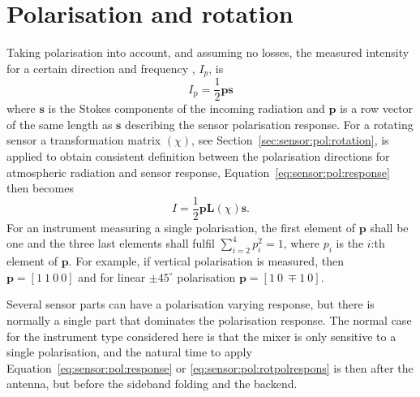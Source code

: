 \section{Polarisation and rotation}
\label{sec:sensor:pol}
Taking polarisation into account, and assuming no losses, the measured intensity for a certain direction and frequency , $I_p$, is
\begin{equation}
\label{eq:sensor:pol:response}
  I_\mathrm{p} = \frac{1}{2} \mathbf{p} \mathbf{s}
\end{equation}
where $\mathbf{s}$ is the Stokes components of the incoming radiation and $\mathbf{p}$ is a row vector of the same length as $\mathbf{s}$ describing the sensor polarisation response. For a rotating sensor a transformation matrix $(\chi)$, see Section~\ref{sec:sensor:pol:rotation}, is applied to obtain consistent definition between the polarisation directions for atmospheric radiation and sensor response, Equation~\ref{eq:sensor:pol:response} then becomes
\begin{equation}
\label{eq:sensor:pol:rotpolrespons}
  I = \frac{1}{2} \mathbf{p} \mathbf{L}(\chi) \mathbf{s}.
\end{equation}
For an instrument measuring a single polarisation, the first element of $\mathbf{p}$ shall be one and the three last elements shall fulfil $\sum_{i=2}^4 p_i^2 = 1$, where
$p_i$ is the $i$:th element of $\mathbf{p}$. For example, if vertical polarisation is measured, then $\mathbf{p}=[1\ 1\ 0\ 0]$ and for linear $\pm45^\circ$ polarisation $\mathbf{p}=[1\ 0\ \mp\!\!1\ 0]$.  

Several sensor parts can have a polarisation varying response, but there is normally a single part that dominates the polarisation response. The normal case for the instrument type considered here is that the mixer is only sensitive to a single polarisation, and the natural time to apply Equation~\ref{eq:sensor:pol:response} or \ref{eq:sensor:pol:rotpolrespons} is then after the antenna, but before the sideband folding and the backend. 

